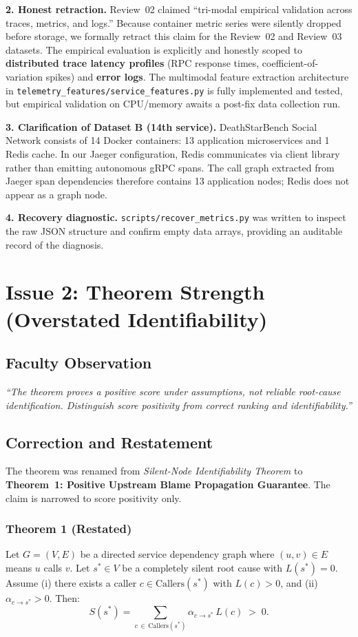 \documentclass[11pt,a4paper]{article}
\begin{document}
\textbf{2. Honest retraction.} Review~02 claimed ``tri-modal empirical validation across traces, metrics, and logs.'' Because container metric series were silently dropped before storage, we formally retract this claim for the Review~02 and Review~03 datasets. The empirical evaluation is explicitly and honestly scoped to \textbf{distributed trace latency profiles} (RPC response times, coefficient-of-variation spikes) and \textbf{error logs}. The multimodal feature extraction architecture in \texttt{telemetry\_features/service\_features.py} is fully implemented and tested, but empirical validation on CPU/memory awaits a post-fix data collection run.

\textbf{3. Clarification of Dataset B (14th service).} DeathStarBench Social Network consists of 14 Docker containers: 13 application microservices and 1 Redis cache. In our Jaeger configuration, Redis communicates via client library rather than emitting autonomous gRPC spans. The call graph extracted from Jaeger span dependencies therefore contains 13 application nodes; Redis does not appear as a graph node.

\textbf{4. Recovery diagnostic.} \texttt{scripts/recover\_metrics.py} was written to inspect the raw JSON structure and confirm empty data arrays, providing an auditable record of the diagnosis.

\section{Issue 2: Theorem Strength (Overstated Identifiability)}

\subsection{Faculty Observation}
\textit{``The theorem proves a positive score under assumptions, not reliable root-cause identification. Distinguish score positivity from correct ranking and identifiability.''}

\subsection{Correction and Restatement}
The theorem was renamed from \emph{Silent-Node Identifiability Theorem} to \textbf{Theorem~1: Positive Upstream Blame Propagation Guarantee}. The claim is narrowed to score positivity only.

\subsubsection{Theorem 1 (Restated)}
Let $G=(V,E)$ be a directed service dependency graph where $(u,v)\in E$ means $u$ calls $v$. Let $s^*\in V$ be a completely silent root cause with $L(s^*)=0$. Assume (i) there exists a caller $c\in\mathrm{Callers}(s^*)$ with $L(c)>0$, and (ii) $\alpha_{c\to s^*}>0$. Then:
\[
  S(s^*) = \sum_{c\,\in\,\mathrm{Callers}(s^*)} \alpha_{c\to s^*}\,L(c) \;>\; 0.
\]
\end{document}
